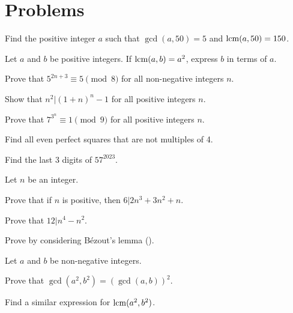 \newpage

\section{Problems}
\begin{problem}
    Find the positive integer $a$ such that $\gcd(a, 50) = 5$ and $\mathrm{lcm}(a, 50) = 150$.
\end{problem}

\begin{problem}
    Let $a$ and $b$ be positive integers. If $\mathrm{lcm}(a, b) = a^2$, express $b$ in terms of $a$.
\end{problem}

\begin{problem}
    Prove that $5^{2n+3} \equiv 5 \pmod 8$ for all non-negative integers $n$.
\end{problem}

\begin{problem}
    Show that $n^2 \vert (1+n)^n - 1$ for all positive integers $n$.
\end{problem}

\begin{problem}
    Prove that $7^{3^n} \equiv 1 \pmod 9$ for all positive integers $n$.
\end{problem}

\begin{problem}
    Find all even perfect squares that are not multiples of 4.
\end{problem}

\begin{problem}
    Find the last 3 digits of $57^{2023}$.
\end{problem}

\begin{problem}
    Let $n$ be an integer.
    \begin{partquestions}{\roman*}
        \item Prove that if $n$ is positive, then $6 \vert 2n^3 + 3n^2 + n$.
        \item Prove that $12 \vert n^4 - n^2$.
    \end{partquestions}
\end{problem}

\begin{problem}\label{problem-n-divides-ab-and-n-coprime-with-a-implies-n-divides-b}
    Prove  by considering B\'ezout's lemma ().
\end{problem}

\begin{problem}
    Let $a$ and $b$ be non-negative integers.
    \begin{partquestions}{\roman*}
        \item Prove that $\gcd(a^2, b^2) = \left(\gcd(a,b)\right)^2$.
        \item Find a similar expression for $\mathrm{lcm}(a^2, b^2)$.
    \end{partquestions}
\end{problem}
